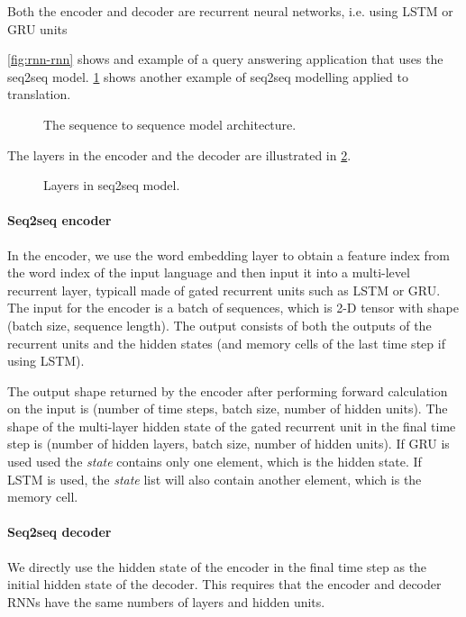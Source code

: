 Both the encoder and decoder are recurrent neural networks, i.e. using LSTM or GRU units


\cref{fig:rnn-rnn} shows and example of a query answering application that uses the seq2seq model. \cref{fig:seq2seq} shows another example of seq2seq modelling applied to translation.

\begin{figure}[hpt]
	\centering
	
	\caption{The sequence to sequence model architecture.}
	\label{fig:seq2seq}
\end{figure}

The layers in the encoder and the decoder are illustrated in \cref{fig:seq2seq_details}.

\begin{figure}[hpt]
	\centering
	
	\caption{Layers in seq2seq model.}
	\label{fig:seq2seq_details}
\end{figure}

\paragraph{Seq2seq encoder}
In the encoder, we use the word embedding layer to obtain a feature index from the word index of the input language and then input it into a multi-level recurrent layer, typicall made of gated recurrent units such as LSTM or GRU. The input for the encoder is a batch of sequences, which is 2-D tensor with shape (batch size, sequence length). The output consists of both the outputs of the recurrent units and the hidden states (and memory cells of the last time step if using LSTM).

The output shape returned by the encoder after performing forward calculation on the input is (number of time steps, batch size, number of hidden units). The shape of the multi-layer hidden state of the gated recurrent unit in the final time step is (number of hidden layers, batch size, number of hidden units). If GRU is used used the \textit{state}  contains only one element, which is the hidden state. If LSTM is used, the \textit{state} list will also contain another element, which is the memory cell.

\paragraph{Seq2seq decoder}
We directly use the hidden state of the encoder in the final time step as the initial hidden state of the decoder. This requires that the encoder and decoder RNNs have the same numbers of layers and hidden units.

